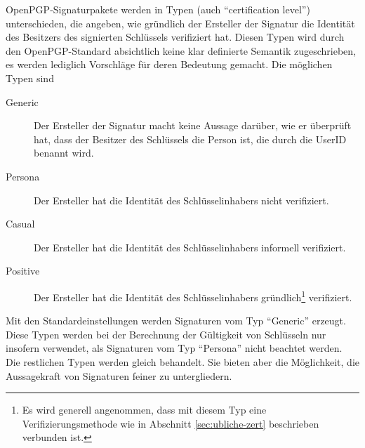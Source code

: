 OpenPGP-Signaturpakete werden in Typen (auch ``certification
level'') unterschieden, die angeben, wie gründlich der Ersteller der
Signatur die Identität des Besitzers des signierten Schlüssels
verifiziert hat. Diesen Typen wird durch den OpenPGP-Standard
absichtlich keine klar definierte Semantik zugeschrieben, es werden
lediglich Vorschläge für deren Bedeutung gemacht. Die möglichen
Typen sind

\begin{description}
\item[Generic] Der Ersteller der Signatur macht keine Aussage
  darüber, wie er überprüft hat, dass der Besitzer des
  Schlüssels die Person ist, die durch die UserID benannt wird.
\item[Persona] Der Ersteller hat die Identität des
  Schlüsselinhabers nicht verifiziert.
\item[Casual] Der Ersteller hat die Identität des
  Schlüsselinhabers informell verifiziert.
\item[Positive] Der Ersteller hat die Identität des
  Schlüsselinhabers gründlich\footnote{Es wird generell
    angenommen, dass mit diesem Typ eine Verifizierungsmethode wie in
    Abschnitt \ref{sec:ubliche-zert} beschrieben verbunden ist.}
  verifiziert.
\end{description}

Mit den Standardeinstellungen werden Signaturen vom Typ ``Generic''
erzeugt. Diese Typen werden bei der Berechnung der Gültigkeit von
Schlüsseln nur insofern verwendet, als Signaturen vom Typ
``Persona'' nicht beachtet werden. Die restlichen Typen werden gleich
behandelt. Sie bieten aber die Möglichkeit, die Aussagekraft von
Signaturen feiner zu untergliedern.

